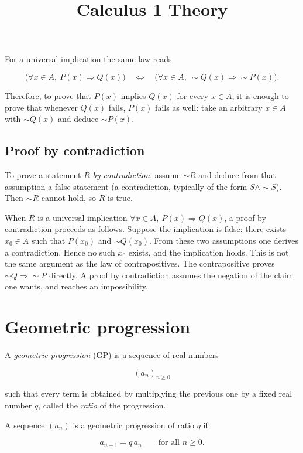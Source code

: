 \documentclass[11pt,a4paper]{article} \usepackage[T1]{fontenc}
\theoremstyle{plain} \newtheorem{theorem}{Theorem} \title{Calculus 1 Theory}
\begin{document}
For a universal implication the same law reads

\[
\bigl(\forall x\in A,\ P(x)\Rightarrow Q(x)\bigr) \quad\Leftrightarrow\quad \bigl(\forall x\in A,\ \sim Q(x)\Rightarrow \sim P(x)\bigr).
\]

Therefore, to prove that $P(x)$ implies $Q(x)$ for every $x\in A$, it is enough
to prove that whenever $Q(x)$ fails, $P(x)$ fails as well: take an arbitrary
$x\in A$ with $\sim Q(x)$ and deduce $\sim P(x)$.

\subsection{Proof by contradiction}

\begin{definition}
 To prove a statement $R$ \emph{by contradiction},
assume $\sim R$ and deduce from that assumption a false statement (a
contradiction, typically of the form $S\land\sim S$). Then $\sim R$ cannot
hold, so $R$ is true.
\end{definition}

When $R$ is a universal implication $\forall x\in A,\ P(x)\Rightarrow Q(x)$, a
proof by contradiction proceeds as follows. Suppose the implication is false:
there exists $x_0\in A$ such that $P(x_0)$ and $\sim Q(x_0)$. From these two
assumptions one derives a contradiction. Hence no such $x_0$ exists, and the
implication holds. This is not the same argument as the law of contrapositives.
The contrapositive proves $\sim Q\Rightarrow\sim P$ directly. A proof by
contradiction assumes the negation of the claim one wants, and reaches an
impossibility.

\section{Geometric progression}

A \emph{geometric progression} (GP) is a sequence of real numbers

\[
(a_n)_{n\ge 0}
\]

such that every term is obtained by multiplying the previous one by a fixed
real number \(q\), called the \emph{ratio} of the progression.

\begin{definition}
 A sequence \((a_n)\) is a geometric progression of
ratio \(q\) if

\[
a_{n+1} = q\,a_n \qquad \text{for all } n\ge 0.
\]

\end{definition}
\end{document}
